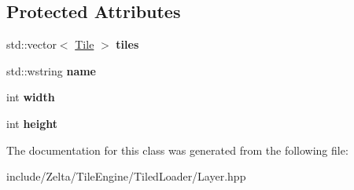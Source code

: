 \subsection*{Protected Attributes}
\begin{DoxyCompactItemize}
\item 
\mbox{\label{classzt_1_1tiled_1_1_layer_a65bd471d225baa753d3cb7e76800a7f1}} 
std\+::vector$<$ \hyperlink{classzt_1_1tiled_1_1_tile}{Tile} $>$ {\bfseries tiles}
\item 
\mbox{\label{classzt_1_1tiled_1_1_layer_accf8e58c7bf6e047d93af28baa793fe2}} 
std\+::wstring {\bfseries name}
\item 
\mbox{\label{classzt_1_1tiled_1_1_layer_ac0465586e45f5cb485c45599763e3b7d}} 
int {\bfseries width}
\item 
\mbox{\label{classzt_1_1tiled_1_1_layer_a3f98f0840078a3713ada2e756b05da57}} 
int {\bfseries height}
\end{DoxyCompactItemize}


The documentation for this class was generated from the following file\+:\begin{DoxyCompactItemize}
\item 
include/\+Zelta/\+Tile\+Engine/\+Tiled\+Loader/Layer.\+hpp\end{DoxyCompactItemize}
